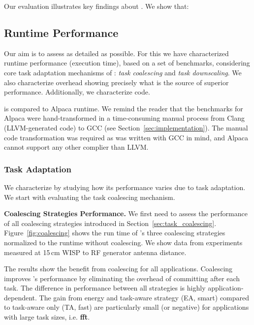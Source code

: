 Our evaluation illustrates key findings about \sys. We show that: 

\subsection{\sys Runtime Performance}
\label{sec:results_evaluation}

Our aim is to assess \sys as detailed as possible. For this we have characterized \sys runtime performance (execution time), based on a set of benchmarks, considering core task adaptation mechanisms of \sys: \emph{task coalescing} and \emph{task downscaling}. We also characterize \sys overhead showing precisely what is the source of \sys superior performance. Additionally, we characterize \sys code. 

\sys is compared to Alpaca runtime. We remind the reader that the benchmarks for Alpaca were hand-transformed in a time-consuming manual process from Clang (LLVM-generated code) to GCC (see Section~\ref{sec:implementation}). The manual code transformation was required as \sys was written with GCC in mind, and Alpaca cannot support any other complier than LLVM.

\subsubsection{\sys Task Adaptation}
\label{sec:result_coalescing}

We characterize \sys by studying how its performance varies due to task adaptation. We start with evaluating the task coalescing mechanism.


\textbf{Coalescing Strategies Performance.} We first need to assess the performance of all coalescing strategies introduced in Section~\ref{sec:task_coalescing}. Figure~\ref{fig:coalescing} shows the run time of \sys's three coalescing strategies normalized to the \sys runtime without coalescing.  We show data from experiments measured at 15\,cm WISP to RF generator antenna distance. 

The results show the benefit from coalescing for all applications. Coalescing improves \sys's performance by eliminating the overhead of committing after each task. The difference in performance between all strategies is highly application-dependent. The gain from energy and task-aware strategy (EA, smart) compared to task-aware only (TA, fast) are particularly small (or negative) for applications with large task sizes, i.e. \textbf{fft}. 

